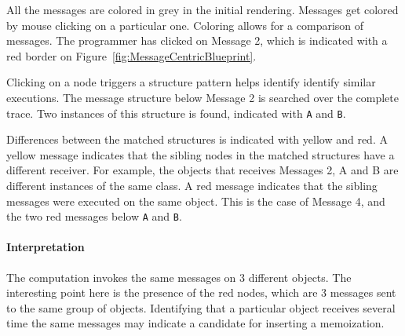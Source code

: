 \documentclass{sig-alternate}
\newcommand{\ct}{\lstinline[backgroundcolor=\color{white},basicstyle=\footnotesize\ttfamily]}
\newcommand{\ab}[1]{\nb{Alexandre}{blue}{#1}}
\newcommand{\jp}[1]{\nb{Juan Pablo}{green}{#1}}
\newcommand{\figref}[1]{Figure~\ref{fig:#1}}
\begin{document}
All the messages are colored in grey in the initial rendering. Messages get colored by mouse clicking on a particular one. 
Coloring allows for a comparison of messages. The programmer has clicked on Message 2, which is indicated with a red border on \figref{MessageCentricBlueprint}. 

Clicking on a node triggers a structure pattern helps identify identify similar executions. The message structure below Message 2 is searched over the complete trace. Two instances of this structure is found, indicated with \ct{A} and \ct{B}.

Differences between the matched structures is indicated with yellow and red. A yellow message indicates that the sibling nodes in the matched structures have a different receiver. For example, the objects that receives Messages 2, A and B are different instances of the same class. A red message indicates that the sibling messages were executed on the same object. This is the case of Message 4, and the two red messages below \ct{A} and \ct{B}. 



\paragraph{Interpretation}
The computation invokes the same messages on 3 different objects. The interesting point here is the presence of the red nodes, which are 3 messages sent to the same group of objects. Identifying that a particular object receives several time the same messages may indicate a candidate for inserting a memoization. 

\end{document}

